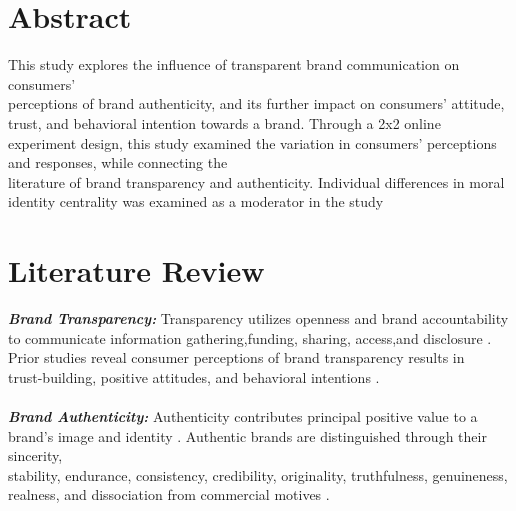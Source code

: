 \documentclass[a0,portrait]{a0poster}
\begin{document}
\begin{minipage}[c]{\linewidth}
\begin{framed}
\begin{multicols}{2}
\section*{Abstract}
\color{Black}
This study explores the influence of transparent brand communication on consumers' \\perceptions of brand authenticity, and its further impact on consumers' attitude, trust, and behavioral intention towards a brand. Through a 2x2 online experiment design, this study examined the variation in consumers' perceptions and responses, while connecting the \\literature of brand transparency and authenticity. Individual differences in moral identity centrality was examined as a moderator in the study
\color{Maroon}
\section*{Literature Review}
\color{Black}
  \color{Maroon} \textbf{\emph{Brand Transparency:}} \color{Black}
Transparency utilizes openness\autocite{parris_exploring_2016} and brand accountability\autocite{yoo_brand_2014} to communicate information gathering,funding, sharing, access,and disclosure \autocite{phillips_online_2009}\autocite{wojdynski_measuring_2018} \autocite{yoo_brand_2014}\autocite{brandao_impact_2018}. Prior studies reveal consumer perceptions of brand transparency results in \\trust-building, positive attitudes, and behavioral intentions \autocite{reynolds_moral_2008}.\\
\\
  \color{Maroon} \textbf{\emph{Brand Authenticity:}} \color{Black} Authenticity contributes principal positive value to a brand's image \autocite{keller_strategic_1998}\autocite{ballantyne_evolution_2006} and identity \autocite{beverland_crafting_2005}\autocite{kapferer_new_2008}. Authentic brands are distinguished through their sincerity, \\stability, endurance, consistency, credibility, originality, truthfulness, genuineness, realness, and dissociation from commercial motives \autocite{bruhn_brand_2012}\autocite{grayson_consumer_2004}\autocite{ballantyne_evolution_2006}\autocite{beverland_real_2006}\autocite{holt_why_2002}. 
  \\
  

\end{multicols}
\end{framed}
\end{minipage}
\end{document}
